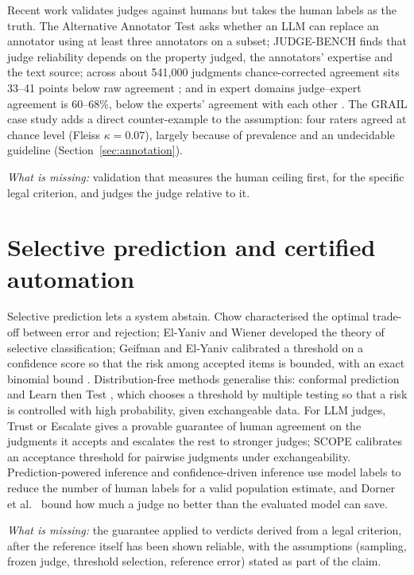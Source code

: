 Recent work validates judges against humans but takes the human labels as the truth. The Alternative Annotator Test \citep{calderon2025} asks whether an LLM can replace an annotator using at least three annotators on a subset; JUDGE-BENCH \citep{bavaresco2025} finds that judge reliability depends on the property judged, the annotators' expertise and the text source; across about 541{,}000 judgments chance-corrected agreement sits 33--41 points below raw agreement \citep{norman2026}; and in expert domains judge--expert agreement is 60--68\%, below the experts' agreement with each other \citep{szymanski2025}. The GRAIL case study adds a direct counter-example to the assumption: four raters agreed at chance level (Fleiss $\kappa=0.07$), largely because of prevalence and an undecidable guideline (Section~\ref{sec:annotation}).

\emph{What is missing:} validation that measures the human ceiling first, for the specific legal criterion, and judges the judge relative to it.

\section{Selective prediction and certified automation}
Selective prediction lets a system abstain. Chow \citep{chow1970} characterised the optimal trade-off between error and rejection; El-Yaniv and Wiener \citep{elyaniv2010} developed the theory of selective classification; Geifman and El-Yaniv \citep{geifman} calibrated a threshold on a confidence score so that the risk among accepted items is bounded, with an exact binomial bound \citep{clopper1934}. Distribution-free methods generalise this: conformal prediction \citep{angelopoulos} and Learn then Test \citep{learntest}, which chooses a threshold by multiple testing so that a risk is controlled with high probability, given exchangeable data. For LLM judges, Trust or Escalate \citep{jung2025} gives a provable guarantee of human agreement on the judgments it accepts and escalates the rest to stronger judges; SCOPE \citep{badshah2026} calibrates an acceptance threshold for pairwise judgments under exchangeability. Prediction-powered inference \citep{ppi} and confidence-driven inference \citep{gligoric2025} use model labels to reduce the number of human labels for a valid population estimate, and Dorner et al.\ \citep{dorner} bound how much a judge no better than the evaluated model can save.

\emph{What is missing:} the guarantee applied to verdicts derived from a legal criterion, after the reference itself has been shown reliable, with the assumptions (sampling, frozen judge, threshold selection, reference error) stated as part of the claim.


